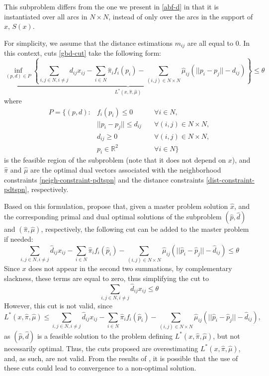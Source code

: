 \documentclass[pdflatex,sn-mathphys-num]{sn-jnl}%
\begin{document}
This subproblem differs from the one we present in \ref{abf-d} in that it is instantiated over all arcs in $N \times N$, instead of only over the arcs in the support of $x$, $S(x)$. 

For simplicity, we assume that the distance estimations $m_{ij}$ are all equal to 0. In this context, cuts \eqref{gbd-cut} take the following form:
\begin{equation}
    \underbrace{\inf_{(p, d) \in P }\left\{\sum_{i,j \in N, i \neq j} d_{ij}x_{ij} - \sum_{i \in N} \hat{\pi}_i f_i(p_i) - \sum_{(i,j) \in N \times N}\hat{\mu}_{ij} (||p_i - p_j|| - d_{ij})\right\}}_{L^*(x,\hat{\pi}, \hat{\mu})} \leq \theta
\end{equation}
where 
\begin{align*}
    P= \{(p,d) : & f_i(p_i) \leq 0 \quad &\forall i \in N, \\
    & ||p_i - p_j|| \leq d_{ij} \quad &\forall (i,j) \in N \times N, \\
    & d_{ij} \geq 0 \quad &\forall (i,j) \in N \times N, \\
    & p_i \in \mathbb{R}^2 \quad &\forall i \in N \}
\end{align*}
is the feasible region of the subproblem (note that it does not depend on $x$), and $\hat{\pi}$ and $\hat{\mu}$ are the optimal dual vectors associated with the neighborhood constraints \eqref{neigh-constraint-pdtspn} and the distance constraints \eqref{dist-constraint-pdtspn}, respectively.

Based on this formulation, \citet{walteros} propose that, given a master problem solution $\hat{x}$, and the corresponding primal and dual optimal solutions of the subproblem $(\hat{p}, \hat{d})$ and $(\hat{\pi}, \hat{\mu})$, respectively, the following cut can be added to the master problem if needed:
\begin{equation}
    \sum_{i,j \in N, i \neq j} \hat{d}_{ij} x_{ij} - \sum_{i \in N} \hat{\pi}_i f_i(\hat{p}_i) - \sum_{(i,j) \in N \times N}\hat{\mu}_{ij} (||\hat{p}_i - \hat{p}_j|| - \hat{d}_{ij}) \leq \theta
\end{equation}
Since $x$ does not appear in the second two summations, by complementary slackness, these terms are equal to zero, thus simplifying the cut to
\begin{equation}
    \sum_{i,j \in N, i \neq j} \hat{d}_{ij} x_{ij} \leq \theta
\end{equation}
However, this cut is not valid, since
\begin{equation}
    L^*(x,\hat{\pi}, \hat{\mu}) \leq \sum_{i,j \in N, i \neq j} \hat{d}_{ij} x_{ij} - \sum_{i \in N} \hat{\pi}_i f_i(\hat{p}_i) - \sum_{(i,j) \in N \times N}\hat{\mu}_{ij} (||\hat{p}_i - \hat{p}_j|| - \hat{d}_{ij}),
\end{equation}
as $(\hat{p}, \hat{d})$ is a feasible solution to the problem defining $L^*(x,\hat{\pi}, \hat{\mu})$, but not necessarily optimal. Thus, the cuts proposed are overestimating $L^*(x,\hat{\pi}, \hat{\mu})$, and, as such, are not valid. From the results of \citet{bagajewicz}, it is possible that the use of these cuts could lead to convergence to a non-optimal solution.
\end{document}
